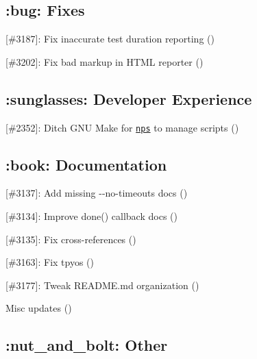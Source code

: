 \subsection*{\+:bug\+: Fixes}


\begin{DoxyItemize}
\item \mbox{[}\#3187\mbox{]}\+: Fix inaccurate test duration reporting (\href{https://github.com/FND}{\tt })
\item \mbox{[}\#3202\mbox{]}\+: Fix bad markup in H\+T\+ML reporter (\href{https://github.com/DanielRuf}{\tt })
\end{DoxyItemize}

\subsection*{\+:sunglasses\+: Developer Experience}


\begin{DoxyItemize}
\item \mbox{[}\#2352\mbox{]}\+: Ditch G\+NU Make for \href{https://npm.im/nps}{\tt nps} to manage scripts (\href{https://github.com/TedYav}{\tt })
\end{DoxyItemize}

\subsection*{\+:book\+: Documentation}


\begin{DoxyItemize}
\item \mbox{[}\#3137\mbox{]}\+: Add missing {\ttfamily -\/-\/no-\/timeouts} docs (\href{https://github.com/dfberry}{\tt })
\item \mbox{[}\#3134\mbox{]}\+: Improve {\ttfamily done()} callback docs (\href{https://github.com/maraisr}{\tt })
\item \mbox{[}\#3135\mbox{]}\+: Fix cross-\/references (\href{https://github.com/vkarpov15}{\tt })
\item \mbox{[}\#3163\mbox{]}\+: Fix tpyos (\href{https://github.com/tbroadley}{\tt })
\item \mbox{[}\#3177\mbox{]}\+: Tweak {\ttfamily R\+E\+A\+D\+M\+E.\+md} organization (\href{https://github.com/xxczaki}{\tt })
\item Misc updates (\href{https://github.com/boneskull}{\tt })
\end{DoxyItemize}

\subsection*{\+:nut\+\_\+and\+\_\+bolt\+: Other}


